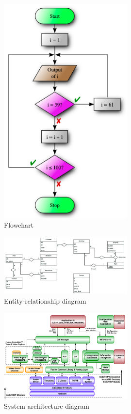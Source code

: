 \documentclass[10pt,letterpaper]{article}
\begin{document}
\begin{figure}
  \centering
  \includegraphics[width=0.6\textwidth]{flowchart.png}
  \caption{Flowchart}
  \label{flowchart}
\end{figure}

\begin{figure}
  \centering
  \includegraphics[width=0.6\textwidth]{er-diagram.png}
  \caption{Entity-relationship diagram}
  \label{er-diagram}
\end{figure}

\begin{figure}
  \centering
  \includegraphics[width=0.6\textwidth]{architecture.png}
  \caption{System architecture diagram}
  \label{architecture}
\end{figure}
\end{document}
